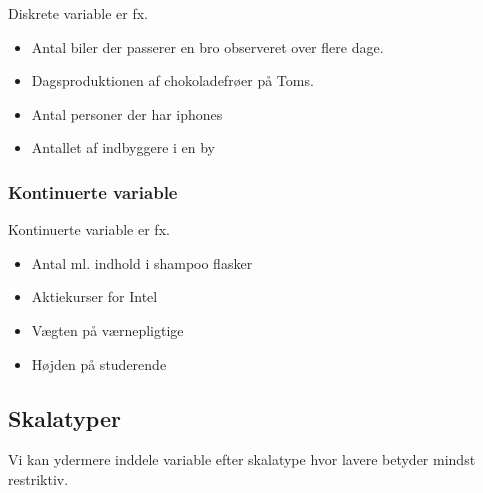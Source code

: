 \documentclass[]{book}
\providecommand{\tightlist}{%
  \setlength{\itemsep}{0pt}\setlength{\parskip}{0pt}}
\begin{document}
Diskrete variable er fx.

\begin{itemize}
\tightlist
\item
  Antal biler der passerer en bro observeret over flere dage.
\item
  Dagsproduktionen af chokoladefrøer på Toms.
\item
  Antal personer der har iphones
\item
  Antallet af indbyggere i en by
\end{itemize}

\hypertarget{kontinuerte-variable}{%
\subsubsection{Kontinuerte variable}\label{kontinuerte-variable}}

Kontinuerte variable er fx.

\begin{itemize}
\tightlist
\item
  Antal ml. indhold i shampoo flasker
\item
  Aktiekurser for Intel
\item
  Vægten på værnepligtige
\item
  Højden på studerende
\end{itemize}

\hypertarget{skalatyper}{%
\subsection{Skalatyper}\label{skalatyper}}

Vi kan ydermere inddele variable efter skalatype hvor lavere betyder mindst restriktiv.
\end{document}
